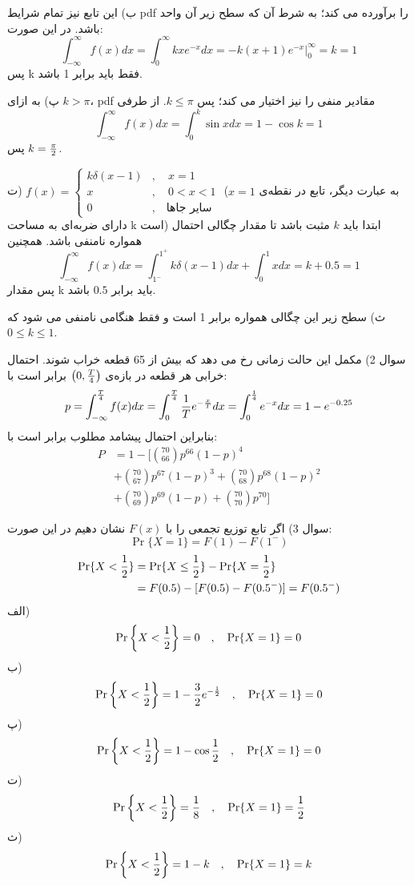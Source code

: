 \documentclass[10pt,letterpaper]{report}
\begin{document}
ب) این تابع نیز تمام شرایط pdf را برآورده می کند؛ به شرط آن که سطح زیر آن واحد باشد. در این صورت:
$$
\int_{-\infty}^\infty f(x)dx=\int_0^\infty kxe^{-x}dx=-k(x+1)e^{-x}|_0^\infty=k=1
$$
پس k فقط باید برابر 1 باشد.

پ) به ازای $k>\pi$، pdf مقادیر منفی را نیز اختیار می کند؛ پس $k\le \pi$. از طرفی
$$
\int_{-\infty}^\infty f(x)dx=\int_0^k\sin xdx=1-\cos k=1
$$
پس $k={\pi\over 2}$.

ت)
$
f(x)=\begin{cases}
k\delta(x-1)&,\quad x=1\\
x&,\quad 0<x<1\\
0&,\quad \text{سایر جاها}
\end{cases}
$
(به عبارت دیگر، تابع در نقطه‌ی $x=1$ دارای ضربه‌ای به مساحت k است)
ابتدا باید $k$ مثبت باشد تا مقدار چگالی احتمال همواره نامنفی باشد. همچنین
$$
\int_{-\infty}^\infty f(x)dx=\int_{1^-}^{1^+} k\delta(x-1)dx+\int_0^1 xdx=k+0.5=1
$$
پس مقدار k باید برابر $0.5$ باشد.

ث) سطح زیر این چگالی همواره برابر 1 است و فقط هنگامی نامنفی می شود که 
$
0\le k\le 1
$.

سوال 2) مکمل این حالت زمانی رخ می دهد که بیش از 65 قطعه خراب شوند. احتمال خرابی هر قطعه در بازه‌ی $
\left(0,{T\over 4}\right)
$
برابر است با:
$$
p=\int_{-\infty}^{T\over 4}f(x)dx=
\int_{0}^{T\over 4}{1\over T}e^{-{x\over T}}dx=
\int_{0}^{1\over 4}e^{-x}dx=1-e^{-0.25}
$$
بنابراین احتمال پیشامد مطلوب برابر است با:
\[
\begin{split}
P&=1-[\binom{70}{66}p^{66}(1-p)^4\\&+\binom{70}{67}p^{67}(1-p)^3
+\binom{70}{68}p^{68}(1-p)^2
\\&+\binom{70}{69}p^{69}(1-p)
+\binom{70}{70}p^{70}
]
\end{split}
\]

سوال 3) اگر تابع توزیع تجمعی را با $F(x)$ نشان دهیم در این صورت:
$$
\Pr\{X=1\}=F(1)-F(1^-)
$$
\[
\begin{split}
\Pr\{X<{1\over 2}\}&=\Pr\{X\le{1\over 2}\}-\Pr\{X={1\over 2}\}\\&=F(0.5)-[F(0.5)-F(0.5^-)]=F(0.5^-)
\end{split}
\]
الف)
$$
\Pr\left\{X<{1\over 2}\right\}=0\quad ,\quad \Pr\{X=1\}=0
$$
ب)
$$
\Pr\left\{X<{1\over 2}\right\}=1-{3\over 2}e^{-{1\over 2}}\quad ,\quad \Pr\{X=1\}=0
$$
پ)
$$
\Pr\left\{X<{1\over 2}\right\}=1-\cos{1\over 2}\quad ,\quad \Pr\{X=1\}=0
$$
ت)
$$
\Pr\left\{X<{1\over 2}\right\}={1\over 8}\quad ,\quad \Pr\{X=1\}={1\over 2}
$$
ث)
$$
\Pr\left\{X<{1\over 2}\right\}=1-k\quad ,\quad \Pr\{X=1\}=k
$$
\end{document}

